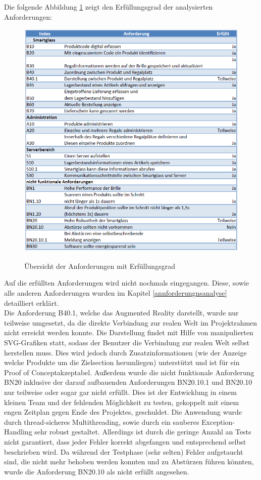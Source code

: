 Die folgende Abbildung \ref{fig:anforderungen_erfuellt} zeigt den Erfüllungsgrad der analysierten Anforderungen:
\begin{figure}[H]
	\centering
	{\includegraphics[width=\textwidth]{Bilder/Abbildungen/anforderungen_zusammenfassung_bewertung.png}}
	\caption{Übersicht der Anforderungen mit Erfüllungsgrad}
	\label{fig:anforderungen_erfuellt}
\end{figure}
Auf die erfüllten Anforderungen wird nicht nochmals eingegangen. Diese, sowie alle anderen Anforderungen wurden im Kapitel \ref{annforderungnsanalyse}  detailliert erklärt.\\
Die Anforderung B40.1, welche das Augmented Reality darstellt, wurde nur teilweise umgesetzt, da die direkte Verbindung zur realen Welt im Projektrahmen nicht erreicht werden konnte. Die Darstellung findet mit Hilfe von manipulierten SVG-Grafiken statt, sodass der Benutzer die Verbindung zur realen Welt selbst herstellen muss. Dies wird jedoch durch Zusatzinformationen (wie \zB der Anzeige welche Produkte um die Zielsection herumliegen) unterstützt und ist für ein \glqq Proof of Concept\grqq akzeptabel.
Außerdem wurde die nicht funktionale Anforderung BN20 inklusive der darauf aufbauenden Anforderungen BN20.10.1 und BN20.10 nur teilweise oder sogar gar nicht erfüllt. Dies ist der Entwicklung in einem kleinen Team und der fehlenden Möglichkeit zu testen, gekoppelt mit einem engen Zeitplan gegen Ende des Projektes, geschuldet. Die Anwendung wurde durch thread-sicheres Multithreading, sowie durch ein sauberes Exception-Handling sehr robust gestaltet. Allerdings ist durch die geringe Anzahl an Tests nicht garantiert, dass jeder Fehler korrekt abgefangen und entsprechend selbst beschrieben wird. Da während der Testphase (sehr selten) Fehler aufgetaucht sind, die nicht mehr behoben werden konnten und zu Abstürzen führen könnten, wurde die Anforderung BN20.10 als nicht erfüllt angesehen.\\

